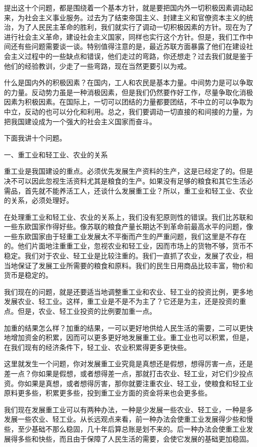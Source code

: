 \documentclass[UTF8, 12pt, a4paper]{ctexrep}
\begin{document}
提出这十个问题，都是围绕着一个基本方针，就是要把国内外一切积极因素调动起来，为社会主义事业服务。过去为了结束帝国主义、封建主义和官僚资本主义的统治，为了人民民主革命的胜利，我们就实行了调动一切积极因素的方针。现在为了进行社会主义革命，建设社会主义国家，同样也实行这个方针。但是，我们工作中间还有些问题需要谈一谈。特别值得注意的是，最近苏联方面暴露了他们在建设社会主义过程中的一些缺点和错误，他们走过的弯路，你还想走？过去我们就是鉴于他们的经验教训，少走了一些弯路，现在当然更要引以为戒。

什么是国内外的积极因素？在国内，工人和农民是基本力量。中间势力是可以争取的力量。反动势力虽是一种消极因素，但是我们仍然要作好工作，尽量争取化消极因素为积极因素。在国际上，一切可以团结的力量都要团结，不中立的可以争取为中立，反动的也可以分化和利用。总之，我们要调动一切直接的和间接的力量，为把我国建设成为一个强大的社会主义国家而奋斗。

下面我讲十个问题。

一、重工业和轻工业、农业的关系

重工业是我国建设的重点。必须优先发展生产资料的生产，这是已经定了的。但是决不可以因此忽视生活资料尤其是粮食的生产。如果没有足够的粮食和其它生活必需品，首先就不能养活工人，还谈什么发展重工业？所以，重工业和轻工业、农业的关系，必须处理好。

在处理重工业和轻工业、农业的关系上，我们没有犯原则性的错误。我们比苏联和一些东欧国家作得好些。像苏联的粮食产量长期达不到革命前最高水平的问题，像一些东欧国家由于轻重工业发展太不平衡而产生的严重问题，我们这里是不存在的。他们片面地注重重工业，忽视农业和轻工业，因而市场上的货物不够，货币不稳定。我们对于农业、轻工业是比较注重的。我们一直抓了农业，发展了农业，相当地保证了发展工业所需要的粮食和原料。我们的民生日用商品比较丰富，物价和货币是稳定的。

我们现在的问题，就是还要适当地调整重工业和农业、轻工业的投资比例，更多地发展农业、轻工业。这样，重工业是不是不为主了？它还是为主，还是投资的重点。但是，农业、轻工业投资的比例要加重一点。

加重的结果怎么样？加重的结果，一可以更好地供给人民生活的需要，二可以更快地增加资金的积累，因而可以更多更好地发展重工业。重工业也可以积累，但是，在我们现有的经济条件下，轻工业、农业积累得更多更快些。

这里就发生一个问题，你对发展重工业究竟是真想还是假想，想得厉害一点，还是差一点？你如果是假想，或者想得差一点，那就打击农业、轻工业，对它们少投点资。你如果是真想，或者想得厉害，那你就要注重农业、轻工业，使粮食和轻工业原料更多些，积累更多些，投到重工业方面的资金将来也会更多些。

我们现在发展重工业可以有两种办法，一种是少发展一些农业、轻工业，一种是多发展一些农业、轻工业。从长远观点来看，前一种办法会使重工业发展得少些和慢些，至少基础不那么稳固，几十年后算总账是划不来的。后一种办法会使重工业发展得多些和快些，而且由于保障了人民生活的需要，会使它发展的基础更加稳固。
\end{document}
